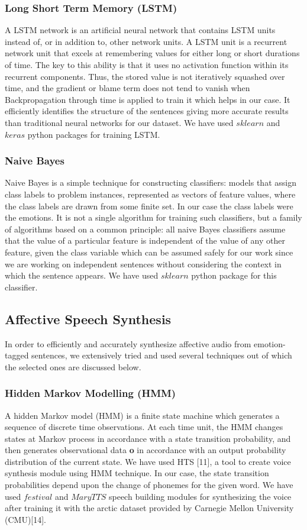 \documentclass[oneside,a4paper,12pt]{book}
\begin{document}
	 \subsubsection{Long Short Term Memory (LSTM) }
	 A LSTM network is an artificial neural network that contains LSTM units instead of, or in addition to, other network units. A LSTM unit is a recurrent network unit that excels at remembering values for either long or short durations of time. The key to this ability is that it uses no activation function within its recurrent components. Thus, the stored value is not iteratively squashed over time, and the gradient or blame term does not tend to vanish when Backpropagation through time is applied to train it which helps in our case.
	 It efficiently identifies the structure of the sentences giving more accurate results than traditional neural networks for our dataset. We have used $sklearn$ and $keras$ python packages for training LSTM.
	 
	 \subsubsection{Naive Bayes}
	 Naive Bayes is a simple technique for constructing classifiers: models that assign class labels to problem instances, represented as vectors of feature values, where the class labels are drawn from some finite set. In our case the class labels were the emotions. It is not a single algorithm for training such classifiers, but a family of algorithms based on a common principle: all naive Bayes classifiers assume that the value of a particular feature is independent of the value of any other feature, given the class variable which can be assumed safely for our work since we are working on independent sentences without considering the context in which the sentence appears. We have used $sklearn$ python package for this classifier.
	 
	\subsection{Affective Speech Synthesis}
	In order to efficiently and accurately synthesize affective audio from emotion-tagged sentences, we extensively tried and used several techniques out of which the selected ones are discussed below.
	\subsubsection{Hidden Markov Modelling (HMM)}
	A hidden Markov model (HMM) is a finite state machine which generates a sequence of discrete time observations. At each time unit, the HMM changes states at Markov process in accordance with a state transition probability,
	and then generates observational data \textbf{o} in accordance with an output probability distribution of the current state. We have used HTS [11], a tool to create voice synthesis module using HMM technique. In our case, the state transition probabilities depend upon the change of phonemes for the given word. We have used $festival$ and $MaryTTS$ speech building modules for synthesizing the voice after training it with the arctic dataset provided by Carnegie Mellon University (CMU)[14].
	
\end{document}
